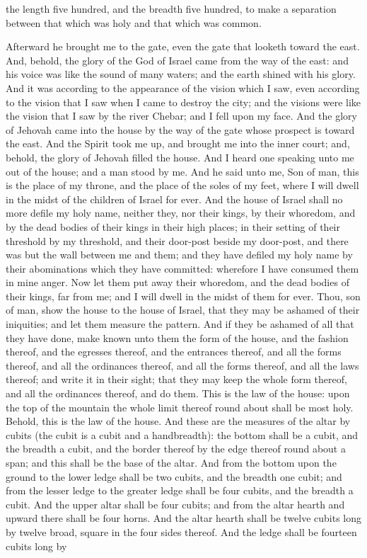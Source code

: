 the length five hundred, and the breadth five hundred, to make a separation between that which was holy and that which was common. 

Afterward he brought me to the gate, even the gate that looketh toward the east. And, behold, the glory of the God of Israel came from the way of the east: and his voice was like the sound of many waters; and the earth shined with his glory. And it was according to the appearance of the vision which I saw, even according to the vision that I saw when I came to destroy the city; and the visions were like the vision that I saw by the river Chebar; and I fell upon my face. And the glory of Jehovah came into the house by the way of the gate whose prospect is toward the east. And the Spirit took me up, and brought me into the inner court; and, behold, the glory of Jehovah filled the house.  And I heard one speaking unto me out of the house; and a man stood by me. And he said unto me, Son of man, this is the place of my throne, and the place of the soles of my feet, where I will dwell in the midst of the children of Israel for ever. And the house of Israel shall no more defile my holy name, neither they, nor their kings, by their whoredom, and by the dead bodies of their kings in their high places; in their setting of their threshold by my threshold, and their door-post beside my door-post, and there was but the wall between me and them; and they have defiled my holy name by their abominations which they have committed: wherefore I have consumed them in mine anger. Now let them put away their whoredom, and the dead bodies of their kings, far from me; and I will dwell in the midst of them for ever.  Thou, son of man, show the house to the house of Israel, that they may be ashamed of their iniquities; and let them measure the pattern. And if they be ashamed of all that they have done, make known unto them the form of the house, and the fashion thereof, and the egresses thereof, and the entrances thereof, and all the forms thereof, and all the ordinances thereof, and all the forms thereof, and all the laws thereof; and write it in their sight; that they may keep the whole form thereof, and all the ordinances thereof, and do them. This is the law of the house: upon the top of the mountain the whole limit thereof round about shall be most holy. Behold, this is the law of the house.  And these are the measures of the altar by cubits (the cubit is a cubit and a handbreadth): the bottom shall be a cubit, and the breadth a cubit, and the border thereof by the edge thereof round about a span; and this shall be the base of the altar. And from the bottom upon the ground to the lower ledge shall be two cubits, and the breadth one cubit; and from the lesser ledge to the greater ledge shall be four cubits, and the breadth a cubit. And the upper altar shall be four cubits; and from the altar hearth and upward there shall be four horns. And the altar hearth shall be twelve cubits long by twelve broad, square in the four sides thereof. And the ledge shall be fourteen cubits long by 